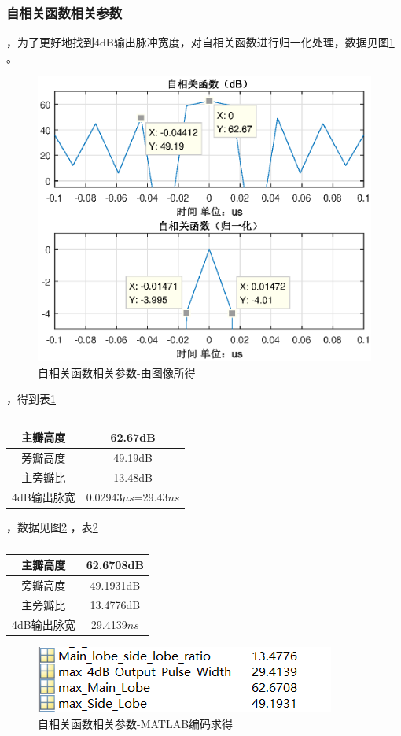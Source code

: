 \documentclass[12pt]{article}
\begin{document}
\subsubsection{自相关函数相关参数}
，为了更好地找到4dB输出脉冲宽度，对自相关函数进行归一化处理，数据见图\ref{zxghs2}
。
\begin{figure}[htbp]
  \centering
  \includegraphics[width=\textwidth]{zxghsshuju}
  \caption{自相关函数相关参数-由图像所得}\label{zxghs2}
\end{figure}
，得到表\ref{1111}
\begin{table}[h]
  \centering
  \caption{}
\begin{tabular}{|c|c|}
  \hline
    主瓣高度&62.67dB\\\hline
    旁瓣高度&49.19dB\\\hline
    主旁瓣比&13.48dB\\\hline
    4dB输出脉宽&0.02943$\mu s$=29.43$ns$\\\hline
  \end{tabular}
  \label{1111}
\end{table}
，数据见图\ref{zxghs3}
，表\ref{1222}
\begin{table}[htbp]
  \centering
  \caption{ }
  \begin{tabular}{|c|c|}
    \hline
    主瓣高度&62.6708dB\\\hline
    旁瓣高度&49.1931dB\\\hline
    主旁瓣比&13.4776dB\\\hline
    4dB输出脉宽&29.4139$ns$\\
    \hline
  \end{tabular}
  \label{1222}
\end{table}
\begin{figure}[htbp]
  \centering
  \includegraphics[width=.6\textwidth]{TIM20190602205603}
  \caption{自相关函数相关参数-MATLAB编码求得}\label{zxghs3}
\end{figure}
\end{document}
